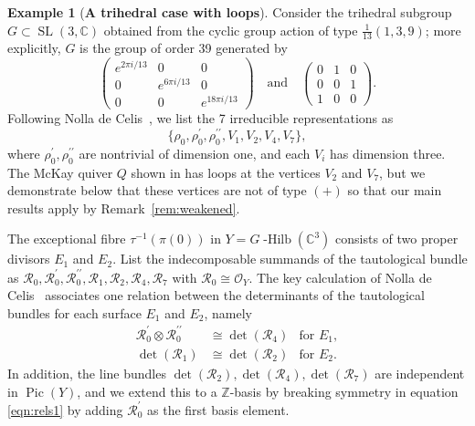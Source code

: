 \documentclass[11pt,reqno]{amsart}
\numberwithin{equation}{section}
\theoremstyle{definition}
\newtheorem{example}[theorem]{Example}
\newcommand{\CC}{\ensuremath{\mathbb{C}}}
\newcommand{\ZZ}{\ensuremath{\mathbb{Z}}}
\newcommand{\ghilb}{\ensuremath{G}\operatorname{-Hilb}}
\newcommand{\0}{\operatorname{0}}
\newcommand{\Pic}{\operatorname{Pic}}
\newcommand{\SL}{\operatorname{SL}}
\begin{document}
 \begin{example}[\textbf{A trihedral case with loops}]
 \label{exa:trihedralNdC}
 Consider the trihedral subgroup $G\subset \SL(3,\CC)$ obtained from the cyclic group action of type $\frac{1}{13}(1,3,9)$; more explicitly, $G$ is the group
 of order 39 generated by
 \[
 \begin{pmatrix} e^{2 \pi i/13} & 0 & 0 \\ 
 0 & e^{6 \pi i/13} & 0 \\ 0 & 0 & e^{18 \pi i/13} \end{pmatrix}\quad\text{and}\quad
  \begin{pmatrix} 
 0 & 1 & 0 \\ 
 0 & 0 & 1 \\ 
 1 & 0 & 0
 \end{pmatrix}.
 \]
 Following Nolla de Celis~\cite[Section~4]{NolladeCelis21}, we list the 7 irreducible representations as
 \begin{equation}
    \label{eqn:irreps}
 \{\rho_0, \rho_{0}^\prime, \rho_{0}^{\prime\prime}, V_{1}, V_2, V_4, V_7\},
  \end{equation}
 where $\rho_{0}^\prime, \rho_{0}^{\prime\prime}$ are nontrivial of dimension one, and each $V_i$ has dimension three. The McKay quiver $Q$ shown in \cite[Figure~8]{NolladeCelis21} has loops at the vertices $V_2$ and $V_7$, but we demonstrate below that these vertices are not of type \ensuremath{(+)} so that our main results apply by Remark~\ref{rem:weakened}.
 
 The exceptional fibre $\tau^{-1}(\pi(0))$ in $Y=\ghilb(\CC^3)$ consists of two proper divisors $E_1$ and $E_2$. List the indecomposable summands of the tautological bundle as $\mathcal{R}_{0}, \mathcal{R}_{0}^\prime, \mathcal{R}_{0}^{\prime\prime}, \mathcal{R}_{1}, \mathcal{R}_2, \mathcal{R}_4, \mathcal{R}_7$ with $\mathcal{R}_{0}\cong \mathcal{O}_Y$. The key calculation of Nolla de Celis~\cite[Proposition~2]{NolladeCelis21} associates one relation between the determinants of the tautological bundles for each surface $E_1$ and $E_2$, namely
   \begin{align}
 \mathcal{R}_0^\prime\otimes \mathcal{R}_0^{\prime\prime} & \cong\det(\mathcal{R}_4)   & \text{for }E_1, \label{eqn:rels1} \\
 \det(\mathcal{R}_1) & \cong  \det(\mathcal{R}_2) & \text{for }E_2. \label{eqn:rels2} 
 \end{align}
 In addition, the line bundles $\det(\mathcal{R}_{2}), \det(\mathcal{R}_4), \det(\mathcal{R}_7)$ are independent in $\Pic(Y)$, and we extend this to a $\ZZ$-basis by breaking symmetry in equation \eqref{eqn:rels1} by adding $\mathcal{R}_0^\prime$ as the first basis element. 
 

\end{example}
\end{document}
